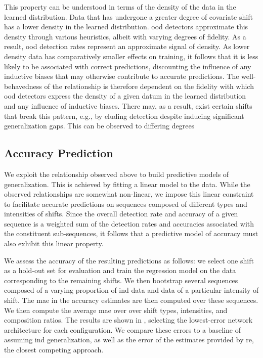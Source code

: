\documentclass[10pt,twocolumn,letterpaper]{article}
\begin{document}
This property can be understood in terms of the density of the data in the learned distribution. Data that has undergone a greater degree of covariate shift has a lower density in the learned distribution. \Gls{ood} detectors approximate this density through various heuristics, albeit with varying degrees of fidelity. As a result, \gls{ood} detection rates represent an approximate signal of density. As lower density data has comparatively smaller effects on training, it follows that it is less likely to be associated with correct predictions, discounting the influence of any inductive biases that may otherwise contribute to accurate predictions. The well-behavedness of the relationship is therefore dependent on the fidelity with which \gls{ood} detectors express the density of a given datum in the learned distribution and any influence of inductive biases. There may, as a result, exist certain shifts that break this pattern, e.g., by eluding detection despite inducing significant generalization gaps. This can be observed to differing degrees

\subsection{Accuracy Prediction}
We exploit the relationship observed above to build predictive models of generalization. This is achieved by fitting a linear model to the data. While the observed relationships are somewhat non-linear, we impose this linear constraint to facilitate accurate predictions on sequences composed of different types and intensities of shifts. Since the overall detection rate and accuracy of a given sequence is a weighted sum of the detection rates and accuracies associated with the constituent sub-sequences, it follows that a predictive model of accuracy must also exhibit this linear property.  

We assess the accuracy of the resulting predictions as follows: we select one shift as a hold-out set for evaluation and train the regression model on the data corresponding to the remaining shifts. We then bootstrap several sequences composed of a varying proportion of \gls{ind} data and data of a particular intensity of shift. The \gls{mae} in the accuracy estimates are then computed over these sequences. We then compute the average \gls{mae} over over shift types, intensities, and composition ratios. The results are shown in , selecting the lowest-error network architecture for each configuration. We compare these errors to a baseline of assuming \gls{ind} generalization, as well as the error of the estimates provided by \gls{re}, the closest competing approach. 
\end{document}
